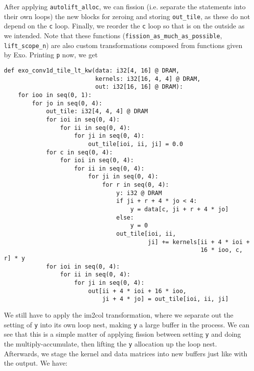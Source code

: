 \documentclass[acmsmall, nonacm=true]{acmart}
\begin{document}
After applying \verb|autolift_alloc|, we can fission (i.e. separate the statements into their own loops) the new blocks for zeroing and storing \verb|out_tile|, as these do not depend on the \verb|c| loop. Finally, we reorder the \verb|c| loop so that is on the outside as we intended. Note that these functions (\verb|fission_as_much_as_possible|, \verb|lift_scope_n|)  are also custom transformations composed from functions given by Exo. Printing \verb|p| now, we get
\begin{verbatim}
def exo_conv1d_tile_lt_kw(data: i32[4, 16] @ DRAM,
                          kernels: i32[16, 4, 4] @ DRAM,
                          out: i32[16, 16] @ DRAM):
    for ioo in seq(0, 1):
        for jo in seq(0, 4):
            out_tile: i32[4, 4, 4] @ DRAM
            for ioi in seq(0, 4):
                for ii in seq(0, 4):
                    for ji in seq(0, 4):
                        out_tile[ioi, ii, ji] = 0.0
            for c in seq(0, 4):
                for ioi in seq(0, 4):
                    for ii in seq(0, 4):
                        for ji in seq(0, 4):
                            for r in seq(0, 4):
                                y: i32 @ DRAM
                                if ji + r + 4 * jo < 4:
                                    y = data[c, ji + r + 4 * jo]
                                else:
                                    y = 0
                                out_tile[ioi, ii,
                                         ji] += kernels[ii + 4 * ioi +
                                                        16 * ioo, c, r] * y
            for ioi in seq(0, 4):
                for ii in seq(0, 4):
                    for ji in seq(0, 4):
                        out[ii + 4 * ioi + 16 * ioo,
                            ji + 4 * jo] = out_tile[ioi, ii, ji]
\end{verbatim}

We still have to apply the im2col transformation, where we separate out the setting of \verb|y| into its own loop nest, making \verb|y| a large buffer in the process. We can see that this is a simple matter of applying fission between setting \verb|y| and doing the multiply-accumulate, then lifting the \verb|y| allocation up the loop nest. Afterwards, we stage the kernel and data matrices into new buffers just like with the output. We have:
\end{document}
